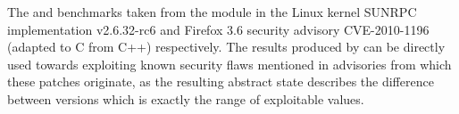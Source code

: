The  and  benchmarks taken from the  module in the Linux kernel SUNRPC implementation v2.6.32-rc6 and Firefox 3.6 security advisory CVE-2010-1196 (adapted to C from C++) respectively. The results produced by \tool can be directly used towards exploiting known security flaws mentioned in advisories from which these patches originate, as the resulting abstract state describes the difference between versions which is exactly the range of exploitable values.

%
%
%
%
